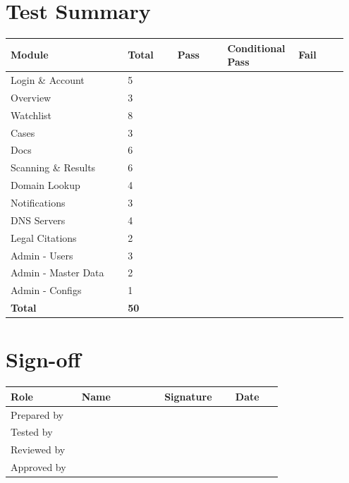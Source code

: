 \documentclass[10pt]{article}
\begin{document}
\section{Test Summary}
\begin{longtable}{p{0.335\linewidth}p{0.140\linewidth}p{0.140\linewidth}p{0.196\linewidth}p{0.140\linewidth}}
\hline
\textbf{Module} & \textbf{Total} & \textbf{Pass} & \textbf{Conditional Pass} & \textbf{Fail} \\ \hline
\endhead
Login \& Account & 5 & & & \\ \hline
Overview & 3 & & & \\ \hline
Watchlist & 8 & & & \\ \hline
Cases & 3 & & & \\ \hline
Docs & 6 & & & \\ \hline
Scanning \& Results & 6 & & & \\ \hline
Domain Lookup & 4 & & & \\ \hline
Notifications & 3 & & & \\ \hline
DNS Servers & 4 & & & \\ \hline
Legal Citations & 2 & & & \\ \hline
Admin - Users & 3 & & & \\ \hline
Admin - Master Data & 2 & & & \\ \hline
Admin - Configs & 1 & & & \\ \hline
\textbf{Total} & \textbf{50} & & & \\ \hline
\end{longtable}

\section{Sign-off}
\begin{longtable}{p{0.248\linewidth}p{0.289\linewidth}p{0.248\linewidth}p{0.165\linewidth}}
\hline
\textbf{Role} & \textbf{Name} & \textbf{Signature} & \textbf{Date} \\ \hline
\endhead
Prepared by & & & \\[1cm] \hline
Tested by & & & \\[1cm] \hline
Reviewed by & & & \\[1cm] \hline
Approved by & & & \\[1cm] \hline
\end{longtable}
\end{document}
